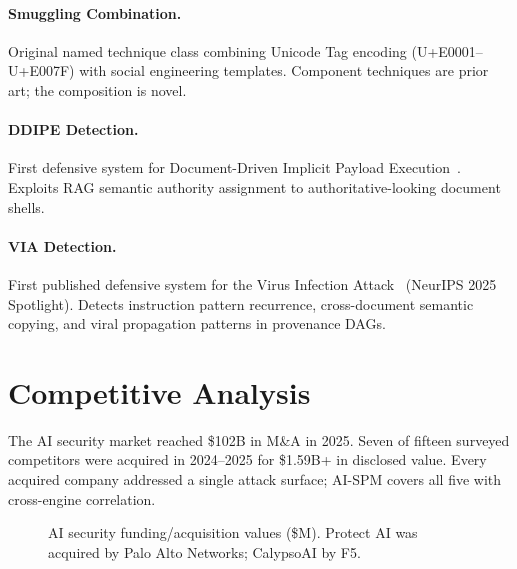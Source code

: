 \documentclass[11pt,twocolumn]{article}
\begin{document}
\paragraph{Smuggling Combination.} Original named technique class combining Unicode Tag encoding (U+E0001--U+E007F) with social engineering templates. Component techniques are prior art; the composition is novel.

\paragraph{DDIPE Detection.} First defensive system for Document-Driven Implicit Payload Execution~\cite{ddipe}. Exploits RAG semantic authority assignment to authoritative-looking document shells.

\paragraph{VIA Detection.} First published defensive system for the Virus Infection Attack~\cite{via} (NeurIPS 2025 Spotlight). Detects instruction pattern recurrence, cross-document semantic copying, and viral propagation patterns in provenance DAGs.

\section{Competitive Analysis}
\label{sec:competitive}

The AI security market reached \$102B in M\&A in 2025. Seven of fifteen surveyed competitors were acquired in 2024--2025 for \$1.59B+ in disclosed value. Every acquired company addressed a single attack surface; AI-SPM covers all five with cross-engine correlation.

\begin{figure}[h]
\centering
{}
\caption{AI security funding/acquisition values (\$M). Protect AI was acquired by Palo Alto Networks; CalypsoAI by F5.}
\label{fig:funding}
\end{figure}
\end{document}

